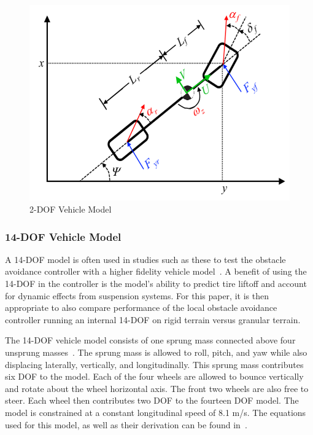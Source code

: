 \documentclass[12pt,twocolumn]{article}
\begin{document}
\begin{figure}
	\centering
	\includegraphics[width=1.0\columnwidth]{Figs/2DOF_haraus.png}
	\caption{\small 2-DOF Vehicle Model}  
	\label{fig:2DOF}
\end{figure}


\subsubsection{14-DOF Vehicle Model}\label{sss:14DOFModel}
A 14-DOF model is often used in studies such as these to test the obstacle avoidance controller with a higher fidelity vehicle model~\cite{ModelFidelity2016, ModelFidelity2013}. A benefit of using the 14-DOF in the controller is the model's ability to predict tire liftoff and account for dynamic effects from suspension systems. For this paper, it is then appropriate to also compare performance of the local obstacle avoidance controller running an internal 14-DOF on rigid terrain versus granular terrain.  

The 14-DOF vehicle model consists of one sprung mass connected above four unsprung masses~\cite{RollStudies2007}. The sprung mass is allowed to roll, pitch, and yaw while also displacing laterally, vertically, and longitudinally. This sprung mass contributes six DOF to the model. Each of the four wheels are allowed to bounce vertically and rotate about the wheel horizontal axis. The front two wheels are also free to steer. Each wheel then contributes two DOF to the fourteen DOF model. The model is constrained at a constant longitudinal speed of 8.1 m/s. The equations used for this model, as well as their derivation can be found in~\cite{RollStudies2007}.
\end{document}
